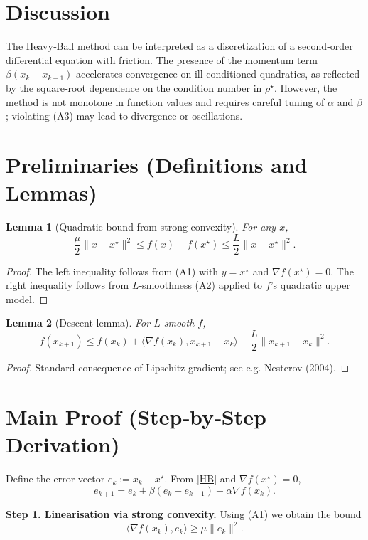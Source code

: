 \documentclass[11pt]{article}
\newtheorem{lemma}{Lemma}
\begin{document}
\section*{Discussion}
The Heavy‑Ball method can be interpreted as a discretization of a second‑order differential equation with friction. The presence of the momentum term $\beta(x_k-x_{k-1})$ accelerates convergence on ill‑conditioned quadratics, as reflected by the square‑root dependence on the condition number in $\rho^\star$. However, the method is not monotone in function values and requires careful tuning of $\alpha$ and $\beta$; violating (A3) may lead to divergence or oscillations.

\newpage
\section*{Preliminaries (Definitions and Lemmas)}
\begin{lemma}[Quadratic bound from strong convexity]\label{lem:sc}
For any $x$,
\[
\frac{\mu}{2}\|x-x^\star\|^{2}\le f(x)-f(x^\star)\le\frac{L}{2}\|x-x^\star\|^{2}.
\tag{L1}
\]
\end{lemma}
\begin{proof}
The left inequality follows from (A1) with $y=x^\star$ and $\nabla f(x^\star)=0$.
The right inequality follows from $L$‑smoothness (A2) applied to $f$’s quadratic upper model.
\end{proof}

\begin{lemma}[Descent lemma]\label{lem:descent}
For $L$‑smooth $f$,
\[
f(x_{k+1})\le f(x_k)+\langle\nabla f(x_k),x_{k+1}-x_k\rangle+\frac{L}{2}\|x_{k+1}-x_k\|^{2}.
\tag{L2}
\]
\end{lemma}
\begin{proof}
Standard consequence of Lipschitz gradient; see e.g. Nesterov (2004).
\end{proof}

\section*{Main Proof (Step‑by‑Step Derivation)}
Define the error vector $e_k:=x_k-x^\star$.  
From \eqref{HB} and $\nabla f(x^\star)=0$,
\[
e_{k+1}=e_k+\beta(e_k-e_{k-1})-\alpha\nabla f(x_k).
\tag{P1}
\]

\noindent\textbf{Step 1. Linearisation via strong convexity.}  
Using (A1) we obtain the bound
\[
\langle\nabla f(x_k),e_k\rangle\ge \mu\|e_k\|^{2}.
\tag{Step 1}
\]
\end{document}
